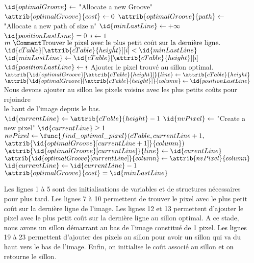 \documentclass[a4paper, 11pt, oneside]{article}
\begin{document}
\begin{codebox} %
        \li $\id{optimalGroove} \gets$ "Allocate a new Groove"
        \li $\attrib{optimalGroove}{cost} \gets 0$
        \li $\attrib{optimalGroove}{path} \gets$ "Allocate a new path of size n"
        \li $\id{minLastLine} \gets +\infty$
        \li $\id{positionLastLine} = 0$
        \li
        \li \For $i \gets 1$ \To $m \text{ }\Comment \text{Trouver le pixel avec le plus petit coût sur la dernière ligne.}$
                \Do
        \li     	\If $\id{cTable}[\attrib{cTable}{height}][i] < \id{minLastLine}$
        \li 			\Then
        					$\id{minLastLine} \gets \id{cTable}[\attrib{cTable}{height}][i]$
        	\li				$\id{positionLastLine} \gets i$
        				\End
                \End
        \li \Comment Ajouter le pixel trouvé au sillon optimal.
        \li $\attrib{\id{optimalGroove}[\attrib{cTable}{height}]}{line} \gets \attrib{cTable}{height}$
        \li $\attrib{\id{optimalGroove}[\attrib{cTable}{height}]}{column} \gets \id{positionLastLine}$
        \li
        \li \Comment Nous devons ajouter au sillon les pixels voisins avec les plus petits coûts pour rejoindre\\ \hspace {0.3cm} le haut de l'image depuis le bas.
        \li $\id{currentLine} \gets \attrib{cTable}{height} - 1$
        \li $\id{nvPixel} \gets$ "Create a new pixel"
        \li
        \li \While $\id{currentLine} \geq 1$
        \li	\Do
        		$nvPixel \gets \func{find\_optimal\_pixel}(cTable, currentLine + 1,$ \\ \hspace{6.15cm} $\attrib{\id{optimalGroove}[currentLine + 1]}{column})$
        \li		$\attrib{\id{optimalGroove}[currentLine]}{line} \gets \id{curentLine}$
        \li		$\attrib{\id{optimalGroove}[currentLine]}{column} \gets \attrib{nvPixel}{column}$
        \li		$\id{currentLine} \gets \id{currentLine} - 1$
        \li	\End
        \li	$\attrib{optimalGroove}{cost} = \id{minLastLine}$
        \li \Return {}
\end{codebox}

Les lignes 1 à 5 sont des initialisations de variables et de structures nécessaires pour plus tard. Les lignes 7 à 10 permettent de trouver le pixel avec le plus petit coût sur la dernière ligne de l'image. Les lignes 12 et 13 permettent d'ajouter le pixel avec le plus petit coût sur la dernière ligne au sillon optimal. A ce stade, nous avons un sillon démarrant au bas de l'image constitué de 1 pixel. Les lignes 19 à 23 permettent d'ajouter des pixels au sillon pour avoir un sillon qui va du haut vers le bas de l'image. Enfin, on initialise le coût associé au sillon et on retourne le sillon.
\end{document}
